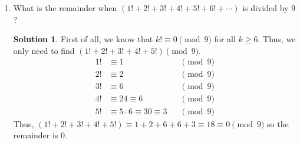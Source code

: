 \documentclass{article}
\theoremstyle{definition}
\newtheorem*{solution}{Solution}
\begin{document}
\begin{multicols}{2}
\begin{enumerate}
        \item What is the remainder when $(1! + 2! + 3! + 4! + 5! + 6! + \cdots)$ is divided by $9$?
            \begin{solution}
                First of all, we know that $k! \equiv 0 \pmod{9}$ for all $k \geq 6$.
                Thus, we only need to find $(1! + 2! + 3! + 4! + 5!) \pmod{9}$.
				\begin{align*}
					1! &\equiv 1 &&\pmod{9} \\
					2! &\equiv 2 &&\pmod{9} \\
					3! &\equiv 6 &&\pmod{9} \\
					4! &\equiv 24 \equiv 6 &&\pmod{9} \\
					5! &\equiv 5 \cdot 6 \equiv 30 \equiv 3 &&\pmod{9}
				\end{align*}
                Thus, $(1! + 2! + 3! + 4! + 5!) \equiv 1 + 2 + 6 + 6 + 3 \equiv 18 \equiv 0 \pmod{9}$ so the remainder is 0.
            \end{solution}
    \end{enumerate}
\end{multicols}
\end{document}
